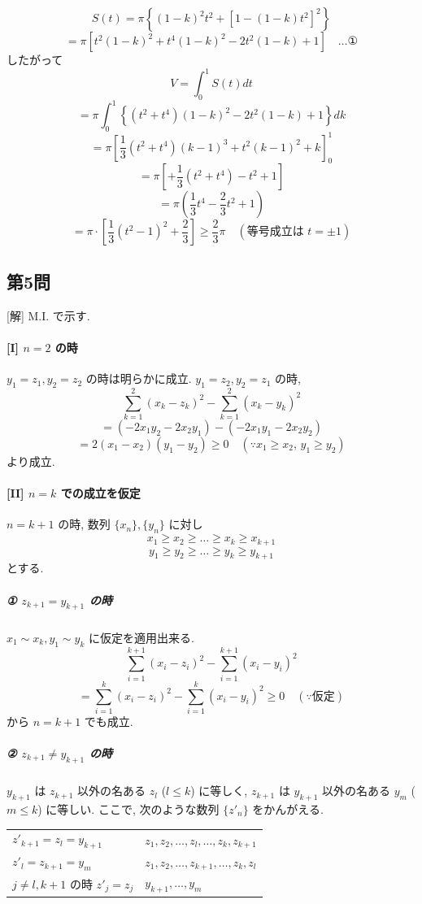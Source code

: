 \documentclass[../main.tex]{subfiles}
\begin{document}
\[
  S(t) = \pi \left\{ (1-k)^2 t^2 + [1 - (1-k)t^2]^2 \right\}
\]
\[
  = \pi \left[ t^2 (1-k)^2 + t^4 (1-k)^2 - 2t^2(1-k) + 1 \right] \quad \dots \text{①}
\]
したがって
\[
  V = \int_0^1 S(t) dt
\]
\[
  = \pi \int_0^1 \left\{ (t^2 + t^4)(1-k)^2 - 2t^2(1-k) + 1 \right\} dk
\]
\[
  = \pi \left[ \frac{1}{3} (t^2 + t^4)(k-1)^3 + t^2 (k-1)^2 + k \right]_0^1
\]
\[
  = \pi \left[ + \frac{1}{3}(t^2 + t^4) - t^2 + 1 \right]
\]
\[
  = \pi \left( \frac{1}{3} t^4 - \frac{2}{3} t^2 + 1 \right)
\]
\[
  = \pi \cdot \left[ \frac{1}{3} (t^2 - 1)^2 + \frac{2}{3} \right] \ge \frac{2}{3}\pi \quad (\text{等号成立は } t = \pm 1)
\]

\subsection*{第5問}

[解] M.I. で示す.

\paragraph{[I] $n=2$ の時}
$y_1 = z_1, y_2 = z_2$ の時は明らかに成立. $y_1 = z_2, y_2 = z_1$ の時,
\[
  \sum_{k=1}^2 (x_k - z_k)^2 - \sum_{k=1}^2 (x_k - y_k)^2
\]
\[
  = (-2x_1 y_2 - 2x_2 y_1) - (-2x_1 y_1 - 2x_2 y_2)
\]
\[
  = 2(x_1 - x_2)(y_1 - y_2) \ge 0 \quad (\because x_1 \ge x_2, \, y_1 \ge y_2)
\]
より成立.

\paragraph{[II] $n=k$ での成立を仮定}
$n = k+1$ の時, 数列 $\{x_n\}, \{y_n\}$ に対し
\[
  x_1 \ge x_2 \ge \dots \ge x_k \ge x_{k+1}
\]
\[
  y_1 \ge y_2 \ge \dots \ge y_k \ge y_{k+1}
\]
とする.

\subparagraph{① $z_{k+1} = y_{k+1}$ の時}
$x_1 \sim x_k, y_1 \sim y_k$ に仮定を適用出来る.
\[
  \sum_{i=1}^{k+1} (x_i - z_i)^2 - \sum_{i=1}^{k+1} (x_i - y_i)^2
\]
\[
  = \sum_{i=1}^k (x_i - z_i)^2 - \sum_{i=1}^k (x_i - y_i)^2 \ge 0 \quad (\because \text{仮定})
\]
から $n = k+1$ でも成立.

\subparagraph{② $z_{k+1} \neq y_{k+1}$ の時}
$y_{k+1}$ は $z_{k+1}$ 以外の名ある $z_l$ ($l \le k$) に等しく, $z_{k+1}$ は $y_{k+1}$ 以外の名ある $y_m$ ($m \le k$) に等しい. ここで, 次のような数列 $\{z'_n\}$ をかんがえる.

\begin{center}
  \begin{tabular}{l|l}
    $z'_{k+1} = z_l = y_{k+1}$ & $z_1, z_2, \dots, z_l, \dots, z_k, z_{k+1}$ \\
    $z'_l = z_{k+1} = y_m$ & $z_1, z_2, \dots, z_{k+1}, \dots, z_k, z_l$ \\
    $j \neq l, k+1$ の時 $z'_j = z_j$ & $y_{k+1}, \dots, y_m$
  \end{tabular}
\end{center}
\end{document}
